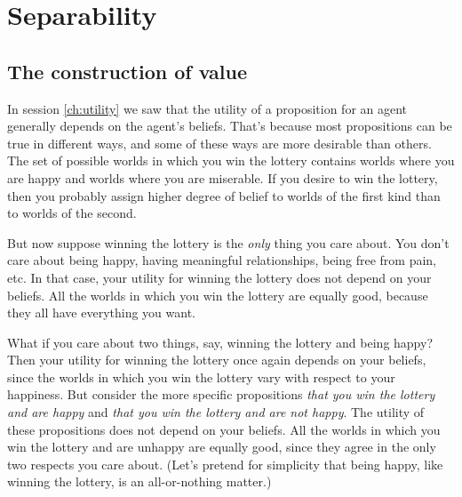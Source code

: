 \chapter{Separability}\label{ch:separability}


\section{The construction of value}\label{sec:construction-value}


In session \ref{ch:utility} we saw that the utility of a proposition
for an agent generally depends on the agent's beliefs. That's because
most propositions can be true in different ways, and some of these
ways are more desirable than others. The set of possible worlds in
which you win the lottery contains worlds where you are happy and
worlds where you are miserable. If you desire to win the lottery, then
you probably assign higher degree of belief to worlds of the first
kind than to worlds of the second.

But now suppose winning the lottery is the \emph{only} thing you care
about. You don't care about being happy, having meaningful
relationships, being free from pain, etc. In that case, your utility
for winning the lottery does not depend on your beliefs. All the
worlds in which you win the lottery are equally good, because they all
have everything you want.

What if you care about two things, say, winning the lottery and being
happy? Then your utility for winning the lottery once again depends on
your beliefs, since the worlds in which you win the lottery vary with
respect to your happiness. But consider the more specific propositions
\emph{that you win the lottery and are happy} and \emph{that you win
  the lottery and are not happy}. The utility of these propositions
does not depend on your beliefs. All the worlds in which you win the
lottery and are unhappy are equally good, since they agree in the only
two respects you care about. (Let's pretend for simplicity that being
happy, like winning the lottery, is an all-or-nothing matter.)


